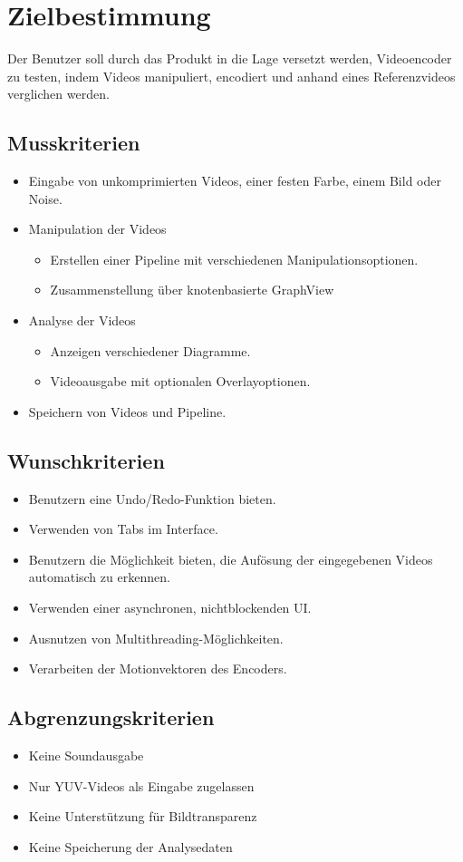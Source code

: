 \section{Zielbestimmung}

Der Benutzer soll durch das Produkt in die Lage versetzt werden, Videoencoder zu testen, indem Videos manipuliert, encodiert und anhand eines Referenzvideos verglichen werden.

\subsection{Musskriterien}

\begin{itemize}
	\item Eingabe von unkomprimierten Videos, einer festen Farbe, einem Bild oder Noise.
	\item Manipulation der Videos
	\begin{itemize}
		\item Erstellen einer Pipeline mit verschiedenen Manipulationsoptionen.
		\item Zusammenstellung über knotenbasierte GraphView
	\end{itemize}
	\item Analyse der Videos
	\begin{itemize}
		\item Anzeigen verschiedener Diagramme.
		\item Videoausgabe mit optionalen Overlayoptionen.
	\end{itemize}
	\item Speichern von Videos und Pipeline.
\end{itemize}

\subsection{Wunschkriterien}

\begin{itemize}
	\item Benutzern eine Undo/Redo-Funktion bieten.
	\item Verwenden von Tabs im Interface.
	\item Benutzern die Möglichkeit bieten, die Aufösung der eingegebenen Videos automatisch zu erkennen.
	\item Verwenden einer asynchronen, nichtblockenden UI.
	\item Ausnutzen von Multithreading-Möglichkeiten.
	\item Verarbeiten der Motionvektoren des Encoders.
\end{itemize}

\subsection{Abgrenzungskriterien}

\begin{itemize}
	\item Keine Soundausgabe
	\item Nur YUV-Videos als Eingabe zugelassen
    \item Keine Unterstützung für Bildtransparenz
	\item Keine Speicherung der Analysedaten
\end{itemize}

